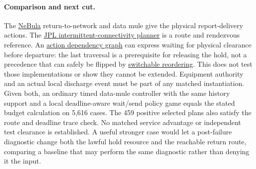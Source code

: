 \documentclass[11pt]{article}
\begin{document}
\paragraph{Comparison and next cut.}
The \href{https://arxiv.org/html/2103.11470}{NeBula} return-to-network and
data mule give the physical report-delivery actions. The
\href{https://superintelligence.jpl.nasa.gov/public/documents/papers/PlanRob-2020-Planning-and-Optimization-for-Multi-Robot-Planetary-Cave-Exploration.pdf}{JPL
intermittent-connectivity planner} is a route and rendezvous reference.
An \href{https://whoenig.github.io/publications/2019_RA-L_Hoenig.pdf}{action
dependency graph} can express waiting for physical clearance before
departure: the last traversal is a prerequisite for releasing the hold,
not a precedence that can safely be flipped by
\href{https://arxiv.org/abs/2312.04190}{switchable reordering}. This does not
test those implementations or show they cannot be extended. Equipment
authority and an actual local discharge event must be part of any
matched instantiation. Given both, an ordinary timed data-mule controller
with the same history support and a local deadline-aware wait/send
policy game equals the stated budget calculation on 5,616 cases. The 459
positive selected plans also satisfy the route and deadline trace check.
No matched service advantage or independent test clearance is established.
A useful stronger case would let a post-failure diagnostic change both the
lawful hold resource and the reachable return route, comparing a baseline
that may perform the same diagnostic rather than denying it the input.
\end{document}
